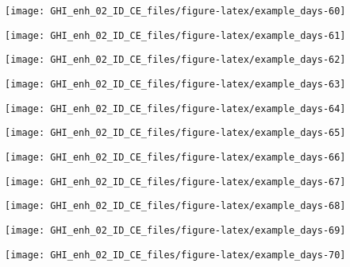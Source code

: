 \documentclass[
  10pt,
  a4paper,oneside]{article}
\begin{document}
\begin{center}\texttt{[image: GHI\_enh\_02\_ID\_CE\_files/figure-latex/example\_days-60]} \end{center}

\begin{center}\texttt{[image: GHI\_enh\_02\_ID\_CE\_files/figure-latex/example\_days-61]} \end{center}

\begin{center}\texttt{[image: GHI\_enh\_02\_ID\_CE\_files/figure-latex/example\_days-62]} \end{center}

\begin{center}\texttt{[image: GHI\_enh\_02\_ID\_CE\_files/figure-latex/example\_days-63]} \end{center}

\begin{center}\texttt{[image: GHI\_enh\_02\_ID\_CE\_files/figure-latex/example\_days-64]} \end{center}

\begin{center}\texttt{[image: GHI\_enh\_02\_ID\_CE\_files/figure-latex/example\_days-65]} \end{center}

\begin{center}\texttt{[image: GHI\_enh\_02\_ID\_CE\_files/figure-latex/example\_days-66]} \end{center}

\begin{center}\texttt{[image: GHI\_enh\_02\_ID\_CE\_files/figure-latex/example\_days-67]} \end{center}

\begin{center}\texttt{[image: GHI\_enh\_02\_ID\_CE\_files/figure-latex/example\_days-68]} \end{center}

\begin{center}\texttt{[image: GHI\_enh\_02\_ID\_CE\_files/figure-latex/example\_days-69]} \end{center}

\begin{center}\texttt{[image: GHI\_enh\_02\_ID\_CE\_files/figure-latex/example\_days-70]} \end{center}
\end{document}
